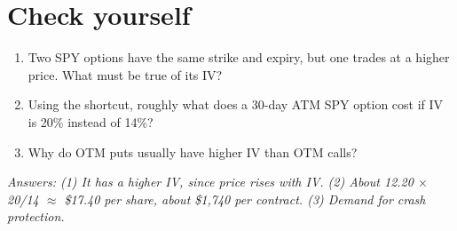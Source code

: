 \documentclass{article}
\begin{document}
\section{Check yourself}

\begin{enumerate}

\item Two SPY options have the same strike and expiry, but one trades at a higher price. What must be true of its IV?

\item Using the shortcut, roughly what does a 30-day ATM SPY option cost if IV is 20\% instead of 14\%?

\item Why do OTM puts usually have higher IV than OTM calls?

\end{enumerate}

\emph{Answers: (1) It has a higher IV, since price rises with IV. (2) About 12.20 \ensuremath{\times} 20/\allowbreak{}14 \ensuremath{\approx} \$17.40 per share, about \$1,740 per contract. (3) Demand for crash protection.}
\end{document}
